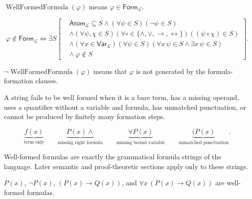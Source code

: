 \begin{remark*}
\(\operatorname{WellFormedFormula}(\varphi)\) means
\(\varphi\in\mathsf{Form}_{\mathcal L}\).
\end{remark*}

\begin{remark*}
\[
\varphi\notin\mathsf{Form}_{\mathcal L}
\Longleftrightarrow
\exists S\left[
\begin{aligned}
&\mathsf{Atom}_{\mathcal L}\subseteq S
\land
(\forall\psi\in S)(\neg\psi\in S)\\
&\land
(\forall\psi,\chi\in S)
(\forall\circ\in\{\land,\lor,\to,\leftrightarrow\})
((\psi\circ\chi)\in S)\\
&\land
(\forall x\in\mathsf{Var}_{\mathcal L})(\forall\psi\in S)
(\forall x\,\psi\in S\land \exists x\,\psi\in S)\\
&\land\ \varphi\notin S
\end{aligned}
\right].
\]
\end{remark*}

\begin{remark*}
\(\neg\operatorname{WellFormedFormula}(\varphi)\) means that \(\varphi\) is not
generated by the formula-formation clauses.
\end{remark*}

\begin{remark*}
A string fails to be well formed when it is a bare term, has a missing operand,
uses a quantifier without a variable and formula, has unmatched punctuation, or
cannot be produced by finitely many formation steps.
\end{remark*}

\begin{remark*}
\[
\underbrace{f(x)}_{\text{term only}}
\qquad
\underbrace{P(x)\land}_{\text{missing right formula}}
\qquad
\underbrace{\forall P(x)}_{\text{missing bound variable}}
\qquad
\underbrace{(P(x)}_{\text{unmatched punctuation}}.
\]
\end{remark*}

\begin{remark*}[Interpretation]
Well-formed formulas are exactly the grammatical formula strings of the
language. Later semantic and proof-theoretic sections apply only to these
strings.
\end{remark*}

\begin{remark*}[Examples]
\(P(x)\), \(\neg P(x)\), \((P(x)\to Q(x))\), and
\(\forall x\,(P(x)\to Q(x))\) are well-formed formulas.
\end{remark*}

